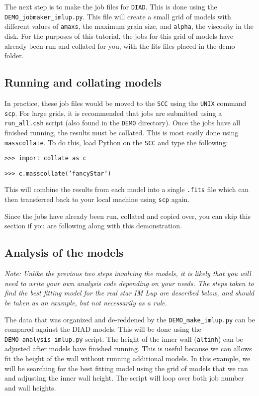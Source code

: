 \documentclass{emulateapj}
\begin{document}
The next step is to make the job files for \texttt{DIAD}. This is done using the \texttt{DEMO\_jobmaker\_imlup.py}. This file will create a small grid of models with different values of \texttt{amaxs}, the maximum grain size, and \texttt{alpha}, the viscosity in the disk. For the purposes of this tutorial, the jobs for this grid of models have already been run and collated for you, with the fits files placed in the demo folder. 

\subsection{Running and collating models}

In practice, these job files would be moved to the \texttt{SCC} using the \texttt{UNIX} command \texttt{scp}. For large grids, it is recommended that jobs are submitted using a \texttt{run\_all.csh} script (also found in the \texttt{DEMO} directory). Once the jobs have all finished running, the results must be collated. This is most easily done using \texttt{masscollate}. To do this, load Python on the \texttt{SCC} and type the following:

\vspace{2mm}
\texttt{>>> import collate as c}

\texttt{>>> c.masscollate('fancyStar')}
\vspace{2mm}

This will combine the results from each model into a single  \texttt{.fits} file which can then transferred back to your local machine using \texttt{scp} again. 

Since the jobs have already been run, collated and copied over, you can skip this section if you are following along with this demonstration.

\subsection{Analysis of the models}

\textit{Note: Unlike the previous two steps involving the models, it is likely that you will need to write your own analysis code depending on your needs. The steps taken to find the best fitting model for the real star IM Lup are described below, and should be taken as an example, but not necessarily as a rule.}
\vspace{2mm}

The data that was organized and de-reddened by the \texttt{DEMO\_make\_imlup.py} can be compared against the DIAD models. This will be done using the \texttt{DEMO\_analysis\_imlup.py} script. 
The height of the inner wall (\texttt{altinh}) can be adjusted after models have finished running. This is useful because we can allows fit the height of the wall without running additional models. 
In this example, we will be searching for the best fitting model using the grid of models that we ran and adjusting the inner wall height. The script will loop over both job number and wall heights.
\end{document}
